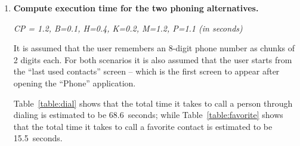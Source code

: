 \begin{enumerate}
\begin{tcblisting}{
    listing only,
    colback = LemonChiffon1
}
Method to accomplish goal of dialing number
Step 1: Recall name of person to call
Step 2: Retrieve-LTM next chunk of person's phone-number
Step 3: Decide: If no more chunks, then return with goal accomplished
Step 4: Decide: If no more digits in chunk, then goto step 2
Step 5: Retain next digit in chunk as button to press
Step 6: Accomplish the goal of pressing a button
Step 7: Goto step 4
\end{tcblisting}

\begin{tcblisting}{
    listing only,
    colback = LemonChiffon1
}
Method to accomplish goal of pressing button
Step 1: Recall button to press
Step 2: Locate button on screen
Step 3: Move finger to button area
Step 4: Press button
Step 5: Return with goal accomplished
\end{tcblisting}

\item \textbf{Compute execution time for the two phoning alternatives.}

\textit{CP = 1.2, B=0.1, H=0.4, K=0.2, M=1.2, P=1.1 (in seconds)}

It is assumed that the user remembers an 8-digit phone number as chunks of 2 digits each. For both scenarios it is also assumed that the user starts from the ``last used contacts'' screen -- which is the first screen to appear after opening the ``Phone'' application.

Table~\ref{table:dial} shows that the total time it takes to call a person through dialing is estimated to be 68.6~seconds; while Table~\ref{table:favorite} shows that the total time it takes to call a favorite contact is estimated to be 15.5~seconds.


\end{enumerate}

